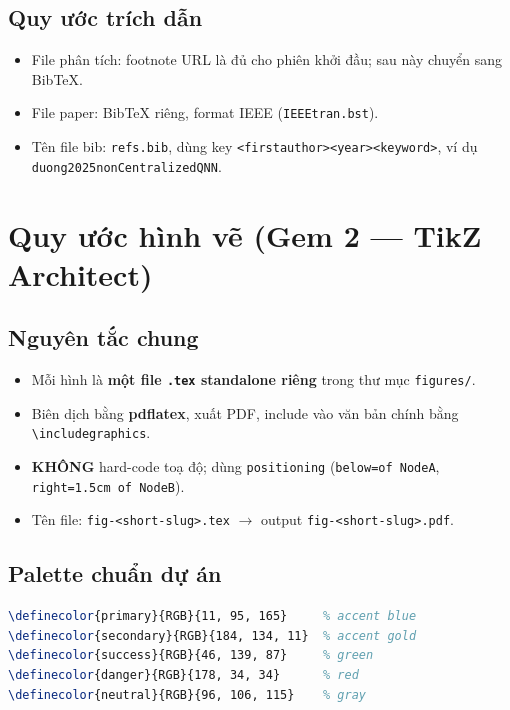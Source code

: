 \documentclass[11pt,a4paper]{article}
\begin{document}
\subsection{Quy ước trích dẫn}

\begin{itemize}
  \item File phân tích: footnote URL là đủ cho phiên khởi đầu; sau này chuyển sang BibTeX.
  \item File paper: BibTeX riêng, format IEEE (\texttt{IEEEtran.bst}).
  \item Tên file bib: \texttt{refs.bib}, dùng key \texttt{<firstauthor><year><keyword>}, ví dụ \texttt{duong2025nonCentralizedQNN}.
\end{itemize}

\section{Quy ước hình vẽ (Gem 2 --- TikZ Architect)}

\subsection{Nguyên tắc chung}

\begin{itemize}
  \item Mỗi hình là \textbf{một file \texttt{.tex} standalone riêng} trong thư mục \texttt{figures/}.
  \item Biên dịch bằng \textbf{pdflatex}, xuất PDF, include vào văn bản chính bằng \texttt{\textbackslash includegraphics}.
  \item \textbf{KHÔNG} hard-code toạ độ; dùng \texttt{positioning} (\texttt{below=of NodeA}, \texttt{right=1.5cm of NodeB}).
  \item Tên file: \texttt{fig-<short-slug>.tex} $\rightarrow$ output \texttt{fig-<short-slug>.pdf}.
\end{itemize}

\subsection{Palette chuẩn dự án}

\begin{lstlisting}[language=TeX]
\definecolor{primary}{RGB}{11, 95, 165}     % accent blue
\definecolor{secondary}{RGB}{184, 134, 11}  % accent gold
\definecolor{success}{RGB}{46, 139, 87}     % green
\definecolor{danger}{RGB}{178, 34, 34}      % red
\definecolor{neutral}{RGB}{96, 106, 115}    % gray
\end{lstlisting}
\end{document}
